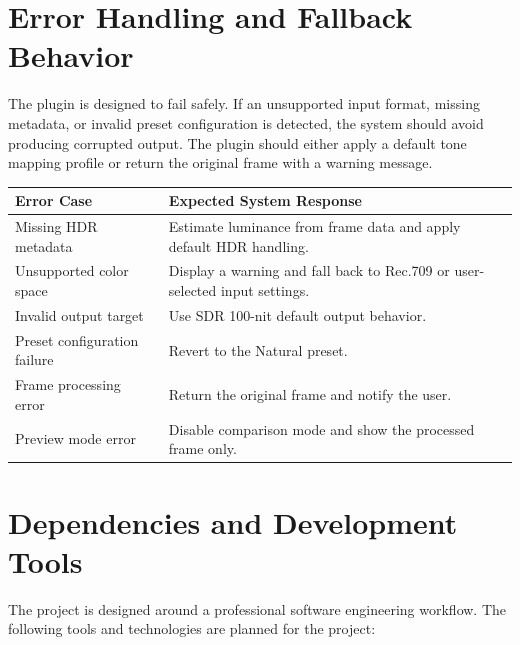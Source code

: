 \documentclass[12pt,hyphens]{article}
\begin{document}

\section{Error Handling and Fallback Behavior}

The plugin is designed to fail safely. If an unsupported input format, missing metadata, or invalid preset configuration is detected, the system should avoid producing corrupted output. The plugin should either apply a default tone mapping profile or return the original frame with a warning message.

\begin{table}[H]
\centering
\renewcommand{\arraystretch}{1.4}
\begin{tabular}{|p{5cm}|p{9cm}|}
\hline
\textbf{Error Case} & \textbf{Expected System Response} \\
\hline
Missing HDR metadata & Estimate luminance from frame data and apply default HDR handling. \\
\hline
Unsupported color space & Display a warning and fall back to Rec.709 or user-selected input settings. \\
\hline
Invalid output target & Use SDR 100-nit default output behavior. \\
\hline
Preset configuration failure & Revert to the Natural preset. \\
\hline
Frame processing error & Return the original frame and notify the user. \\
\hline
Preview mode error & Disable comparison mode and show the processed frame only. \\
\hline
\end{tabular}
\end{table}


\section{Dependencies and Development Tools}

The project is designed around a professional software engineering workflow. The following tools and technologies are planned for the project:
\end{document}
